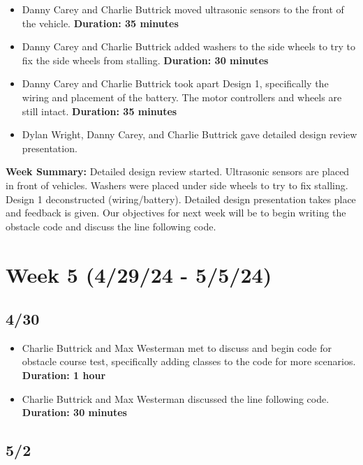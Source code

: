 \documentclass[11pt]{report}
\begin{document}
\begin{itemize}
    \item Danny Carey and Charlie Buttrick moved ultrasonic sensors to the front of the vehicle. \textbf{Duration: 35 minutes}
    \item Danny Carey and Charlie Buttrick added washers to the side wheels to try to fix the side wheels from stalling. \textbf{Duration: 30 minutes}
    \item Danny Carey and Charlie Buttrick took apart Design 1, specifically the wiring and placement of the battery. The motor controllers and wheels are still intact. \textbf{Duration: 35 minutes}
    \item Dylan Wright, Danny Carey, and Charlie Buttrick gave detailed design review presentation.
\end{itemize}

\textbf{Week Summary:} Detailed design review started. Ultrasonic sensors are placed in front of vehicles. Washers were placed under side wheels to try to fix stalling. Design 1 deconstructed (wiring/battery). Detailed design presentation takes place and feedback is given. Our objectives for next week will be to begin writing the obstacle code and discuss the line following code.

\section{Week 5 (4/29/24 - 5/5/24)}
\subsection*{4/30}

\begin{itemize}
    \item Charlie Buttrick and Max Westerman met to discuss and begin code for obstacle course test, specifically adding classes to the code for more scenarios. \textbf{Duration: 1 hour}
    \item Charlie Buttrick and Max Westerman discussed the line following code. \textbf{Duration: 30 minutes}
\end{itemize}

\subsection*{5/2}
\end{document}
